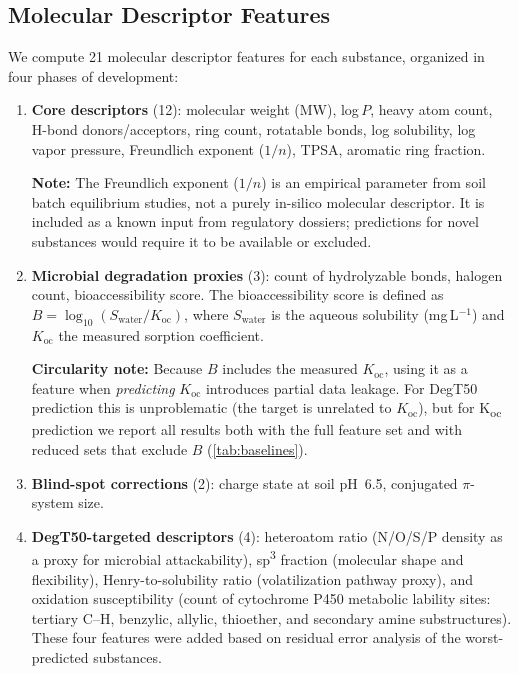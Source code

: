 \documentclass[twoside,twocolumn,9pt]{article}
\newcommand{\degtl}{DegT50}
\newcommand{\koc}{K\textsubscript{oc}}
\newcommand{\nfeat}{21}
\begin{document}
\subsection{Molecular Descriptor Features}
\label{sec:features}

We compute \nfeat{} molecular descriptor features for each substance,
organized in four phases of development:

\begin{enumerate}[nosep]
  \item \textbf{Core descriptors} (12): molecular weight (MW),
        log\,$P$, heavy atom count, H-bond donors/acceptors, ring count,
        rotatable bonds, log solubility, log vapor pressure, Freundlich
        exponent ($1/n$), TPSA, aromatic ring fraction.

        \textbf{Note:} The Freundlich exponent ($1/n$) is an empirical
        parameter from soil batch equilibrium studies, not a purely
        in-silico molecular descriptor. It is included as a known input
        from regulatory dossiers; predictions for novel substances would
        require it to be available or excluded.
  \item \textbf{Microbial degradation proxies} (3): count of hydrolyzable
        bonds, halogen count, bioaccessibility score. The bioaccessibility
        score is defined as
        $B = \log_{10}(S_\text{water} / K_\text{oc})$,
        where $S_\text{water}$ is the aqueous solubility (mg\,L$^{-1}$) and
        $K_\text{oc}$ the measured sorption coefficient.

        \textbf{Circularity note:} Because $B$ includes the measured
        $K_\text{oc}$, using it as a feature when \emph{predicting}
        $K_\text{oc}$ introduces partial data leakage. For \degtl{}
        prediction this is unproblematic (the target is unrelated to
        $K_\text{oc}$), but for \koc{} prediction we report all results
        both with the full feature set and with reduced sets that
        exclude $B$ (\ref{tab:baselines}).
  \item \textbf{Blind-spot corrections} (2): charge state at soil pH~6.5,
        conjugated $\pi$-system size.
  \item \textbf{DegT50-targeted descriptors} (4): heteroatom ratio
        (N/O/S/P density as a proxy for microbial attackability),
        sp\textsuperscript{3} fraction (molecular shape and flexibility),
        Henry-to-solubility ratio (volatilization pathway proxy), and
        oxidation susceptibility (count of cytochrome P450 metabolic
        lability sites: tertiary C--H, benzylic, allylic, thioether, and
        secondary amine substructures). These four features were added
        based on residual error analysis of the worst-predicted
        substances.


\end{enumerate}
\end{document}
